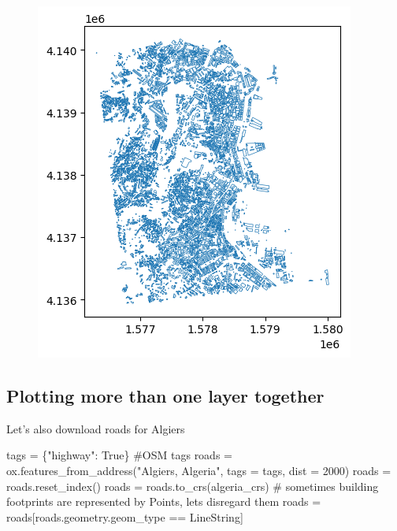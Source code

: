 \documentclass[
  letterpaper,
  DIV=11,
  numbers=noendperiod]{scrreprt}
\newenvironment{Shaded}{\begin{snugshade}}{\end{snugshade}}
\newcommand{\CommentTok}[1]{\textcolor[rgb]{0.37,0.37,0.37}{#1}}
\newcommand{\DecValTok}[1]{\textcolor[rgb]{0.68,0.00,0.00}{#1}}
\newcommand{\NormalTok}[1]{\textcolor[rgb]{0.00,0.23,0.31}{#1}}
\newcommand{\OperatorTok}[1]{\textcolor[rgb]{0.37,0.37,0.37}{#1}}
\newcommand{\StringTok}[1]{\textcolor[rgb]{0.13,0.47,0.30}{#1}}
\newcommand{\VariableTok}[1]{\textcolor[rgb]{0.07,0.07,0.07}{#1}}
\begin{document}
\begin{figure}[H]

{\centering \includegraphics{labs/w02_maps_files/figure-pdf/cell-17-output-2.png}

}

\end{figure}

\hypertarget{plotting-more-than-one-layer-together}{%
\subsection{Plotting more than one layer
together}\label{plotting-more-than-one-layer-together}}

Let's also download roads for Algiers

\begin{Shaded}
\begin{Highlighting}[]
\NormalTok{tags }\OperatorTok{=}\NormalTok{ \{}\StringTok{"highway"}\NormalTok{: }\VariableTok{True}\NormalTok{\} }\CommentTok{\#OSM tags}
\NormalTok{roads }\OperatorTok{=}\NormalTok{ ox.features\_from\_address(}\StringTok{"Algiers, Algeria"}\NormalTok{, tags }\OperatorTok{=}\NormalTok{ tags, dist }\OperatorTok{=} \DecValTok{2000}\NormalTok{) }
\NormalTok{roads }\OperatorTok{=}\NormalTok{ roads.reset\_index()}
\NormalTok{roads }\OperatorTok{=}\NormalTok{ roads.to\_crs(algeria\_crs)}
 \CommentTok{\# sometimes building footprints are represented by Points, let\textquotesingle{}s disregard them}
\NormalTok{roads }\OperatorTok{=}\NormalTok{ roads[roads.geometry.geom\_type }\OperatorTok{==} \StringTok{\textquotesingle{}LineString\textquotesingle{}}\NormalTok{]}
\end{Highlighting}
\end{Shaded}
\end{document}
